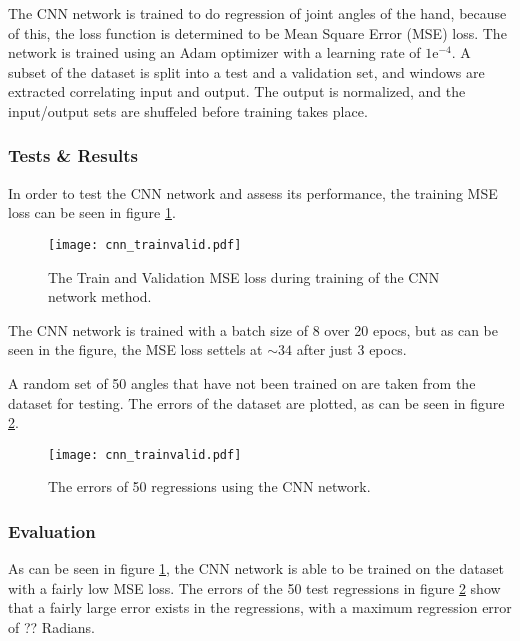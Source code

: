 \documentclass[../main.tex]{subfiles}
\begin{document}
The CNN network is trained to do regression of joint angles of the hand, because of this, the loss function is determined to be Mean Square Error (MSE) loss.
The network is trained using an Adam optimizer with a learning rate of $1\text{e}^{-4}$.
A subset of the dataset is split into a test and a validation set, and windows are extracted correlating input and output.
The output is normalized, and the input/output sets are shuffeled before training takes place.

\subsubsection{Tests \& Results}

In order to test the CNN network and assess its performance, the training MSE loss can be seen in figure \ref{fig:cnntrainvalid}.

\begin{figure}[h]
\begin{center}
\texttt{[image: cnn\_trainvalid.pdf]}
\caption{The Train and Validation MSE loss during training of the CNN network method.}
\label{fig:cnntrainvalid}
\end{center}
\end{figure}

The CNN network is trained with a batch size of 8 over 20 epocs, but as can be seen in the figure, the MSE loss settels at $\sim 34$ after just 3 epocs.

A random set of 50 angles that have not been trained on are taken from the dataset for testing.
The errors of the dataset are plotted, as can be seen in figure \ref{fig:cnntest}.

\begin{figure}[h]
\begin{center}
\texttt{[image: cnn\_trainvalid.pdf]}
\caption{The errors of 50 regressions using the CNN network.}
\label{fig:cnntest}
\end{center}
\end{figure}

\subsubsection{Evaluation}

As can be seen in figure \ref{fig:cnntrainvalid}, the CNN network is able to be trained on the dataset with a fairly low MSE loss.  
The errors of the 50 test regressions in figure \ref{fig:cnntest} show that a fairly large error exists in the regressions, with a maximum regression error of ?? Radians.
\end{document}
